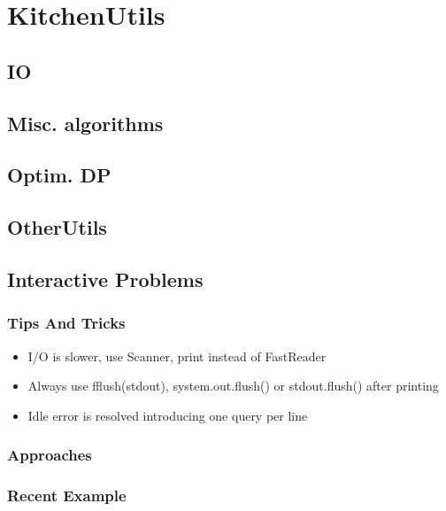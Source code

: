 \chapter{KitchenUtils}

\section{IO}

\section{Misc. algorithms}

 \section{Optim. DP}

  \section{OtherUtils}

  \section{Interactive Problems}
  	\subsection{Tips And Tricks}
		\begin{itemize}
			\item I/O is slower, use Scanner, print instead of FastReader
			\item Always use fflush(stdout), system.out.flush() or stdout.flush() after printing
			\item Idle error is resolved introducing one query per line
		\end{itemize}
  	\subsection{Approaches}
	\subsection{Recent Example}
